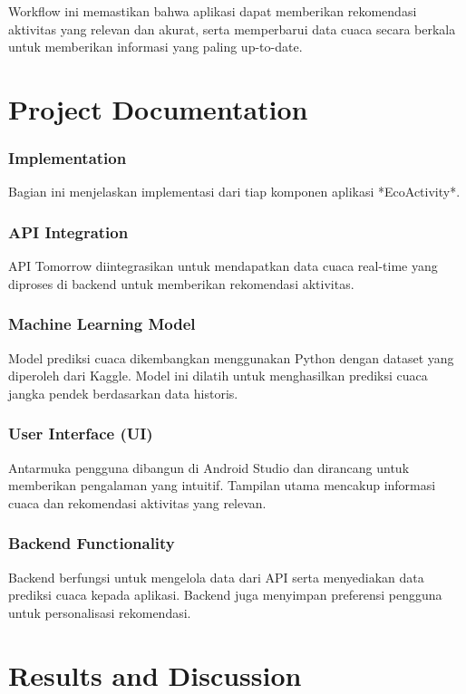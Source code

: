 \documentclass[journal,article,submit,pdftex,moreauthors]{Definitions/mdpi}
\begin{document}
Workflow ini memastikan bahwa aplikasi dapat memberikan rekomendasi aktivitas yang relevan dan akurat, serta memperbarui data cuaca secara berkala untuk memberikan informasi yang paling up-to-date.

\section{Project Documentation}
\subsubsection{Implementation}

Bagian ini menjelaskan implementasi dari tiap komponen aplikasi *EcoActivity*.

\subsubsection{API Integration}
API Tomorrow diintegrasikan untuk mendapatkan data cuaca real-time yang diproses di backend untuk memberikan rekomendasi aktivitas.

\subsubsection{Machine Learning Model}
Model prediksi cuaca dikembangkan menggunakan Python dengan dataset yang diperoleh dari Kaggle. Model ini dilatih untuk menghasilkan prediksi cuaca jangka pendek berdasarkan data historis.

\subsubsection{User Interface (UI)}
Antarmuka pengguna dibangun di Android Studio dan dirancang untuk memberikan pengalaman yang intuitif. Tampilan utama mencakup informasi cuaca dan rekomendasi aktivitas yang relevan.

\subsubsection{Backend Functionality}
Backend berfungsi untuk mengelola data dari API serta menyediakan data prediksi cuaca kepada aplikasi. Backend juga menyimpan preferensi pengguna untuk personalisasi rekomendasi.
\section{Results and Discussion}
\end{document}
